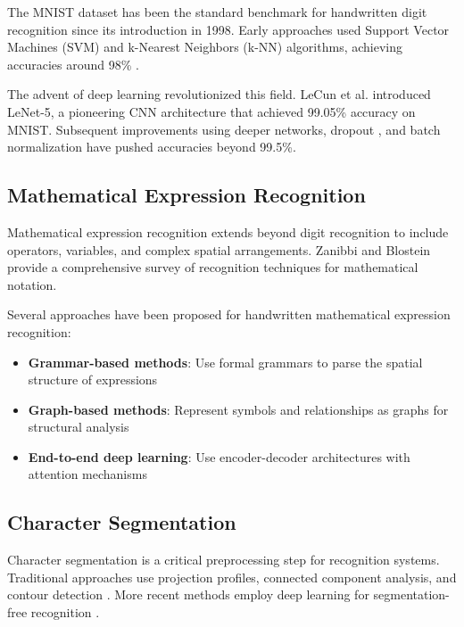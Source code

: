 \documentclass[conference]{IEEEtran}
\begin{document}
The MNIST dataset \cite{lecun1998mnist} has been the standard benchmark for handwritten digit recognition since its introduction in 1998. Early approaches used Support Vector Machines (SVM) and k-Nearest Neighbors (k-NN) algorithms, achieving accuracies around 98\% \cite{lecun1998gradient}.

The advent of deep learning revolutionized this field. LeCun et al. \cite{lecun1998gradient} introduced LeNet-5, a pioneering CNN architecture that achieved 99.05\% accuracy on MNIST. Subsequent improvements using deeper networks, dropout \cite{srivastava2014dropout}, and batch normalization \cite{ioffe2015batch} have pushed accuracies beyond 99.5\%.

\subsection{Mathematical Expression Recognition}

Mathematical expression recognition extends beyond digit recognition to include operators, variables, and complex spatial arrangements. Zanibbi and Blostein \cite{zanibbi2012recognition} provide a comprehensive survey of recognition techniques for mathematical notation.

Several approaches have been proposed for handwritten mathematical expression recognition:

\begin{itemize}
    \item \textbf{Grammar-based methods}: Use formal grammars to parse the spatial structure of expressions \cite{lavirotte1998mathematical}
    \item \textbf{Graph-based methods}: Represent symbols and relationships as graphs for structural analysis \cite{awal2014global}
    \item \textbf{End-to-end deep learning}: Use encoder-decoder architectures with attention mechanisms \cite{zhang2017watch}
\end{itemize}

\subsection{Character Segmentation}

Character segmentation is a critical preprocessing step for recognition systems. Traditional approaches use projection profiles, connected component analysis, and contour detection \cite{casey1996survey}. More recent methods employ deep learning for segmentation-free recognition \cite{shi2016end}.
\end{document}
